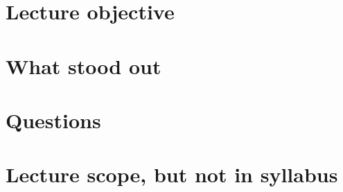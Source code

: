 \documentclass[11pt]{article}
\title{$TITLE}
\author{@benetis}
\date{\today}
\begin{document}
\maketitle

\section*{Lecture objective}

\section*{What stood out}

\section*{Questions}

\section*{Lecture scope, but not in syllabus}
\end{document}
